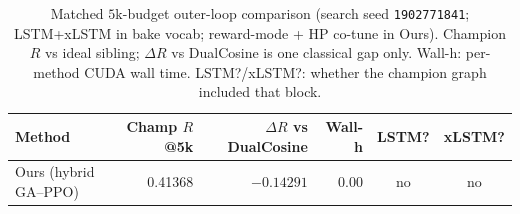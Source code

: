 \begin{table}[t]
  \centering
  \caption{Matched $5$k-budget outer-loop comparison (search seed \texttt{1902771841}; LSTM+xLSTM in bake vocab; reward-mode + HP co-tune in Ours). Champion $R$ vs ideal sibling; $\Delta R$ vs DualCosine is one classical gap only. Wall-h: per-method CUDA wall time. LSTM?/xLSTM?: whether the champion graph included that block.}
  \label{tab:meta-approaches}
  \setlength{\tabcolsep}{3pt}
  \small
  \begin{tabular}{@{}lrrrcc@{}}
    \toprule
    Method & Champ $R$@5k & $\Delta R$ vs DualCosine & Wall-h & LSTM? & xLSTM? \\
    \midrule
    Ours (hybrid GA--PPO) & 0.41368 & $-0.14291$ & 0.00 & no & no \\
    \bottomrule
  \end{tabular}
\end{table}
